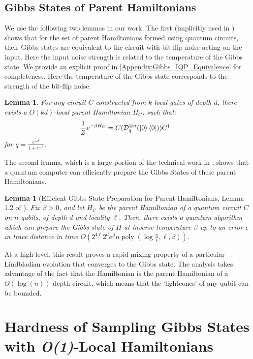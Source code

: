 \documentclass[a4paper,onecolumn,11pt,accepted=2017-05-09]{quantumarticle}
\newcommand{\ox}{\otimes}
\newcommand{\cD}{\mathcal{D}}
\DeclareMathOperator{\poly}{poly}
\newtheorem{lemma}[theorem]{Lemma}
\begin{document}
 \subsection{Gibbs States of Parent Hamiltonians}
 We use the following two lemmas in our work. The first (implicitly used in \cite{bergamaschi2024sample}) shows that for the set of parent Hamiltonians formed using quantum circuits, their Gibbs states are equivalent to the circuit with bit-flip noise acting on the input.
 Here the input noise strength is related to the temperature of the Gibbs state.
 We provide an explicit proof in \cref{Appendix:Gibbs_IQP_Equivalence} for completeness.
    Here the temperature of the Gibbs state corresponds to the strength of the bit-flip noise.
	\begin{lemma}\label{Lemma:Gibbs_to_Circuit_Sampling_Main}
		For any circuit $C$ constructed from $k$-local gates of depth $d$, there exists a $O(kd)$-local parent Hamiltonian $H_C$, such that:
  \begin{align*}
      \frac{1}{Z}e^{-\beta H_C} &= C(\cD_q^{\ox n}(\ket{0}\bra{0}))C^\dagger
  \end{align*}
  for $q = \frac{e^{-\beta}}{1+e^{-\beta}}$.
	\end{lemma}

 The second lemma, which is a large portion of the technical work in \cite{bergamaschi2024sample}, shows that a quantum computer can efficiently prepare the Gibbs States of these parent Hamiltonians.
 \begin{lemma}[Efficient Gibbs State Preparation for Parent Hamiltonians, Lemma 1.2 of \cite{bergamaschi2024sample}] \label{Theorem:Efficient_Gibbs_Prep}
		Fix $\beta > 0$, and let $H_C$ be the parent Hamiltonian of a quantum circuit $C$ on $n$ qubits, of depth $d$ and locality $\ell$. Then, there exists a quantum algorithm which can prepare the Gibbs state of $H$ at inverse-temperature $\beta$ up to an error $\epsilon$ in trace distance in time $O(2^{4\ell}2^d e^\beta n\poly(\log \frac{n}{\epsilon},\ell,\beta))$.
	\end{lemma}

    At a high level, this result proves a rapid mixing property of a particular Lindbladian evolution that converges to the Gibbs state. The analysis takes advantage of the fact that the Hamiltonian is the parent Hamiltonian of a $O(\log(n))$-depth circuit, which means that the `lightcones' of any qubit can be bounded.

	
\section{Hardness of Sampling Gibbs States with \textit{O(1)}-Local Hamiltonians}
 \label{Sec:Hardness_of_Sampling}
\end{document}
